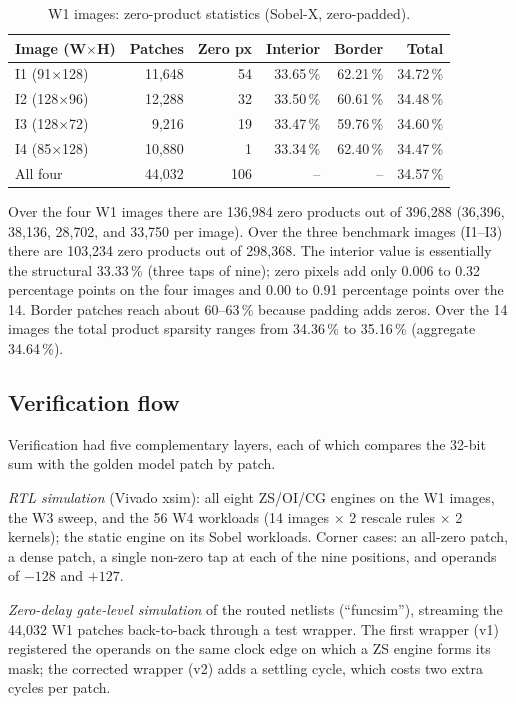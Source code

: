 \documentclass[11pt,journal,draftclsnofoot,onecolumn]{IEEEtran}
\begin{document}
\begin{table}[t]
\centering
\caption{W1 images: zero-product statistics (Sobel-X, zero-padded).}
\label{tab:sparsity}
\small
\setlength{\tabcolsep}{6pt}
\begin{tabular}{lrrrrr}
\toprule
\textbf{Image (W$\times$H)} & \textbf{Patches} & \textbf{Zero px} & \textbf{Interior} & \textbf{Border} & \textbf{Total}\\
\midrule
I1 (91$\times$128)  & 11{,}648 & 54 & 33.65\,\% & 62.21\,\% & 34.72\,\%\\
I2 (128$\times$96)  & 12{,}288 & 32 & 33.50\,\% & 60.61\,\% & 34.48\,\%\\
I3 (128$\times$72)  &  9{,}216 & 19 & 33.47\,\% & 59.76\,\% & 34.60\,\%\\
I4 (85$\times$128)  & 10{,}880 &  1 & 33.34\,\% & 62.40\,\% & 34.47\,\%\\
\midrule
All four            & 44{,}032 & 106 & --       & --        & 34.57\,\%\\
\bottomrule
\end{tabular}
\end{table}

Over the four W1 images there are 136{,}984 zero products out of 396{,}288 (36{,}396,
38{,}136, 28{,}702, and 33{,}750 per image). Over the three benchmark images (I1--I3)
there are 103{,}234 zero products out of 298{,}368. The interior value is essentially the
structural 33.33\,\% (three taps of nine); zero pixels add only 0.006 to 0.32 percentage
points on the four images and 0.00 to 0.91 percentage points over the 14. Border patches
reach about 60--63\,\% because padding adds zeros. Over the 14 images the total product
sparsity ranges from 34.36\,\% to 35.16\,\% (aggregate 34.64\,\%).

\subsection{Verification flow}\label{sec:m-verify}
Verification had five complementary layers, each of which compares the 32-bit sum with the golden model
patch by patch.

\emph{RTL simulation} (Vivado xsim): all eight ZS/OI/CG engines on the W1 images, the W3
sweep, and the 56 W4 workloads (14 images $\times$ 2 rescale rules $\times$ 2 kernels); the
static engine on its Sobel workloads. Corner cases: an all-zero patch, a dense patch, a
single non-zero tap at each of the nine positions, and operands of $-128$ and $+127$.

\emph{Zero-delay gate-level simulation} of the routed netlists (``funcsim''), streaming the
44{,}032 W1 patches back-to-back through a test wrapper. The first wrapper (v1)
registered the operands on the same clock edge on which a ZS engine forms its mask; the
corrected wrapper (v2) adds a settling cycle, which costs two extra cycles per patch.
\end{document}
